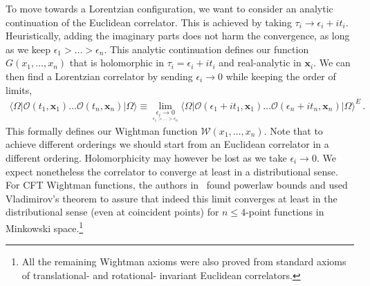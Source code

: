 To move towards a Lorentzian configuration, we want to consider an analytic continuation of the Euclidean correlator. This is achieved  by taking $\tau_i\to \epsilon_i+i t_i$. Heuristically, adding the imaginary parts does not harm the convergence,  as long as we keep  $\epsilon_1>\dots>\epsilon_n$. This analytic continuation defines our function $G(x_1,\dots,x_n)$ that is holomorphic in $\tau_i= \epsilon_i+i t_i$ and real-analytic in $\textbf{x}_i$. We can then find a Lorentzian correlator by sending $\epsilon_i\to0$ while keeping the order of limits,
\begin{align}
  \label{eq:wightmancorrdef}
  \langle \Omega| \mathcal{O}(t_1,\textbf{x}_1)\dots\mathcal{O}(t_n,\textbf{x}_n) |\Omega\rangle\equiv \lim_{\underset{\epsilon_1>\dots>\epsilon_n}{\epsilon_i\to0}}	\langle \Omega| \mathcal{O}(\epsilon_1+i t_1,\textbf{x}_1)\dots\mathcal{O}(\epsilon_n+i t_n,\textbf{x}_n) |\Omega\rangle^{E}\,.
\end{align}
This formally defines our Wightman function $\mathcal{W}(x_1,\dots,x_n)$. Note that to achieve different orderings we should start from an Euclidean correlator in a different ordering.
Holomorphicity may however be lost as we take $\epsilon_i \to 0$. We expect nonetheless the correlator to converge at least in a distributional sense. For CFT Wightman functions, the authors in~\cite{Kravchuk:2021kwe} found powerlaw bounds and used Vladimirov's theorem to assure that indeed this limit converges at least in the distributional sense (even at coincident points) for $n\leq 4$-point functions in Minkowski space.\footnote{All the remaining Wightman axioms were also proved from standard axioms of translational- and rotational- invariant Euclidean correlators.}

